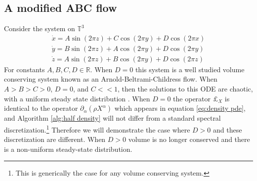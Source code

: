 \documentclass[final,leqno]{siamltex1213}
\begin{document}
\subsection{A modified ABC flow}
Consider the system on $\mathbb{T}^{3}$
\begin{align}
	\dot{x} = A \sin( 2\pi z) + C \cos(2\pi y)  + D \cos(2\pi x)\\
	\dot{y} = B \sin( 2\pi z) + A \cos(2\pi y)  + D \cos(2\pi y)\\
	\dot{z} = A \sin( 2\pi z) + B \cos(2\pi y)  + D \cos(2\pi z)
\end{align}
For constants $A,B,C,D \in \mathbb{R}$.  When $D=0$ this system is a well studied volume conserving system known as an Arnold-Beltrami-Childress flow.
When $A > B > C > 0$, $D=0$, and $C << 1$, then the solutions to this ODE are chaotic, with a uniform steady state distribution \cite{MajdaBertozzi2002}.
When $D=0$ the operator $\pounds_{X}$ is identical to the operator $\partial_{\alpha}( \rho X^{\alpha})$ which appears in equation \eqref{eq:density pde},
and Algorithm \ref{alg:half density} will not differ from a standard spectral discretization.\footnote{This is generically the case for any volume conserving system.}
Therefore we will demonstrate the case where $D > 0$ and these discretization are different.
When $D> 0$ volume is no longer conserved and there is a non-uniform steady-state distribution.
\end{document}
